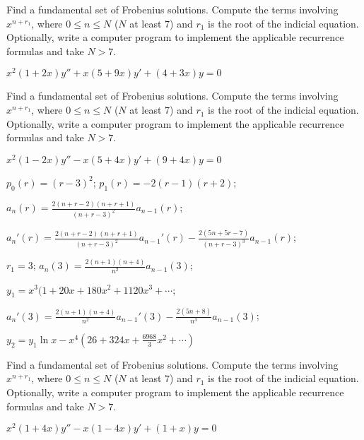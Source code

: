 \documentclass{ximera}
\begin{document}
\begin{problem}\label{exer:7.6.23}
Find a
fundamental set of Frobenius solutions. Compute the terms involving
$x^{n+r_1}$, where $0\le n\le N$ ($N$ at least $7$) and $r_1$ is the
root of the indicial equation. Optionally, write a computer program to
implement the applicable recurrence formulas and take $N>7$.

$x^2(1+2x)y''+x(5+9x)y'+(4+3x)y=0$
\end{problem}

\begin{problem}\label{exer:7.6.24}
Find a
fundamental set of Frobenius solutions. Compute the terms involving
$x^{n+r_1}$, where $0\le n\le N$ ($N$ at least $7$) and $r_1$ is the
root of the indicial equation. Optionally, write a computer program to
implement the applicable recurrence formulas and take $N>7$.

$x^2(1-2x)y''-x(5+4x)y'+(9+4x)y=0$

\begin{solution}
    $p_0(r)=(r-3)^2$;
$p_1(r)=-2(r-1)(r+2)$;

$a_n(r)=\frac
{2(n+r-2)(n+r+1)}{(n+r-3)^2}a_{n-1}(r)$;


$a_n'(r)=\frac
{2(n+r-2)(n+r+1)}{(n+r-3)^2}a_{n-1}'(r)
-\frac{2(5n+5r-7)}{(n+r-3)^3}a_{n-1}(r)$;

$r_1=3$;
$a_n(3)=\frac
{2(n+1)(n+4)}{ n^2}a_{n-1}(3)$;

$y_1=x^3(1+20x+180x^2+1120x^3+\cdots$;

$a_n'(3)=\frac
{2(n+1)(n+4)}{ n^2}a_{n-1}'(3)
-\frac{2(5n+8)}{ n^3}a_{n-1}(3)$;

$y_2=y_1\ln
x-x^4\left(26+324x+\frac{6968}{3}x^2+\cdots\right)$
\end{solution}
\end{problem}

\begin{problem}\label{exer:7.6.25}
Find a
fundamental set of Frobenius solutions. Compute the terms involving
$x^{n+r_1}$, where $0\le n\le N$ ($N$ at least $7$) and $r_1$ is the
root of the indicial equation. Optionally, write a computer program to
implement the applicable recurrence formulas and take $N>7$.

$x^2(1+4x)y''-x(1-4x)y'+(1+x)y=0$
\end{problem}
\end{document}
